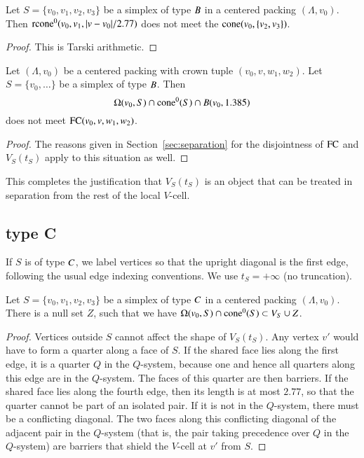 \begin{lemma}
 Let $S=\{v_0,v_1,v_2,v_3\}$ be a simplex of type $B$ in a centered packing $(\Lambda,v_0)$.
Then  ${\operatorname{rcone}}^0(v_0,v_1,|v-v_0|/2.77)$ does not meet the
${\operatorname{cone}}(v_0,\{v_2,v_3\})$.
\end{lemma}

\begin{proof} This is Tarski arithmetic.
\end{proof}

\begin{lemma} 
Let $(\Lambda,v_0)$ be a centered packing with crown tuple $(v_0,v,w_1,w_2)$.
Let $S=\{v_0,\ldots\}$ be a simplex of type $B$. Then
$$\Omega(v_0,S) \cap {\operatorname{cone}}^0(S) \cap B(v_0,1.385)$$
does not meet ${\operatorname{FC}}(v_0,v,w_1,w_2)$.
\end{lemma}

\begin{proof}
The reasons given in Section~\ref{sec:separation} for the
disjointness of ${\operatorname{FC}}$ and $V_S(t_S)$ apply to this
situation as well.
\end{proof}


This completes the justification that
$V_S(t_S)$ is an object that can be treated in separation from the
rest of the local $V$-cell.

\subsection{type C}%

If $S$ is of type $C$, we label vertices so that
the upright diagonal is the first edge, following the usual
edge indexing conventions.  We use $t_S =+\infty$ (no
truncation).   

\begin{lemma}
Let $S=\{v_0,v_1,v_2,v_3\}$ be a simplex of type $C$ in a centered packing
$(\Lambda,v_0)$.
There is a null set $Z$, such that
we have  $ \Omega(v_0,S) \cap {\operatorname{cone}}^0(S) \subset V_S \cup Z$.
\end{lemma}

\begin{proof}  %
Vertices outside $S$ cannot affect the shape of $V_S(t_S)$.  Any
vertex $v'$ would have to form a quarter along a face of $S$.  If
the shared face lies along the first edge, it is a quarter $Q$ in
the $Q$-system, because one and hence all quarters along this edge
are in the $Q$-system.  The faces of this quarter are then
barriers. If the shared face lies along the fourth edge, then its
length is at most $2.77$, so that the quarter cannot be part of an
isolated pair. If it is not in the $Q$-system, there must be a
conflicting diagonal. The two faces along this conflicting
diagonal of the adjacent pair in the $Q$-system (that is, the pair
taking precedence over $Q$ in the $Q$-system) are barriers that
shield the $V$-cell at $v'$ from $S$.
\end{proof}


